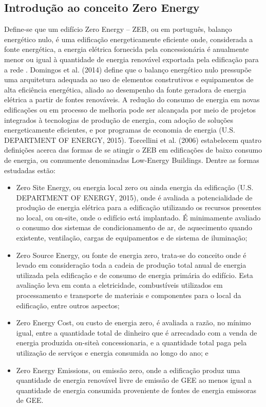 \subsection{Introdução ao conceito Zero Energy}
Define-se que um edifício Zero Energy – ZEB, ou em português, balanço 
energético nulo, é uma edificação  energeticamente  eficiente  onde,  
considerada  a  fonte  energética,  a  energia  elétrica fornecida pela 
concessionária é anualmente menor ou igual à quantidade de energia renovável 
exportada pela edificação para a rede 
\cite{Torcellini2006,U.S.DepartmentofEnergy-USDOE2012,U.S.DepartmentofEnergy-USDOE2015}. 
Domingos et al.  (2014)  define  que  o  balanço  energético  nulo  pressupõe  
uma  arquitetura adequada ao uso de elementos construtivos e equipamentos 
de alta eficiência energética, aliado ao desempenho da fonte geradora de 
energia elétrica a partir de fontes renováveis. A redução do consumo de 
energia em novas edificações ou em processo de melhoria pode ser alcançada 
por meio de projetos integrados à tecnologias de produção de energia, com 
adoção de soluções   energeticamente   eficientes,   e   por   programas   
de   economia   de   energia   (U.S. DEPARTMENT OF ENERGY, 2015). 
Torcellini et al. (2006) estabelecem quatro definições acerca das formas de 
se atingir o ZEB em edificações  de  baixo  consumo  de  energia,  ou  
comumente  denominadas Low-Energy Buildings. Dentre as formas estudadas estão: 
\begin{itemize}
    \item Zero Site Energy, ou energia local zero ou ainda energia da 
    edificação (U.S. DEPARTMENT OF ENERGY, 2015), onde é avaliada a 
    potencialidade de produção de energia elétrica para a  edificação  
    utilizando  os  recursos  presentes  no  local,  ou on-site,  onde  o  
    edifício  está implantado. É minimamente avaliado o consumo dos 
    sistemas de condicionamento de ar, de aquecimento quando existente, 
    ventilação, cargas de equipamentos e de sistema de iluminação;
    \item Zero Source Energy,  ou  fonte  de  energia  zero,  trata-se  do  
    conceito  onde  é  levado  em consideração toda a cadeia de produção 
    total anual de energia utilizada pela edificação e de consumo de 
    energia primária do edifício. Esta avaliação leva em conta a 
    eletricidade, combustíveis utilizados em processamento e transporte de 
    materiais e componentes para o local da edificação, entre outros aspectos;
    \item Zero Energy Cost, ou custo de energia zero, é avaliada a razão, 
    no mínimo igual, entre a quantidade total de dinheiro que é arrecadado 
    com a venda de energia produzida on-siteà  concessionaria,  e  a  
    quantidade  total  paga  pela  utilização  de  serviços  e  energia 
    consumida ao longo do ano; e 
    \item Zero Energy Emissions,  ou  emissão  zero,  onde  a  edificação  
    produz  uma  quantidade  de energia  renovável  livre  de  emissão  
    de  GEE  ao  menos  igual  a  quantidade  de  energia consumida 
    proveniente de fontes de energia emissoras de GEE.
\end{itemize}

